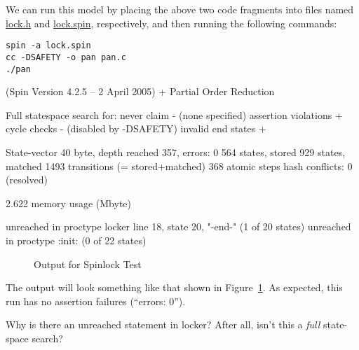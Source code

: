 We can run this model by placing the above two code fragments into
files named \url{lock.h} and \url{lock.spin}, respectively, and then running
the following commands:

\vspace{5pt}
\begin{minipage}[t]{\columnwidth}
\scriptsize
\begin{verbatim}
spin -a lock.spin
cc -DSAFETY -o pan pan.c
./pan
\end{verbatim}
\end{minipage}
\vspace{5pt}

{ \scriptsize
\begin{verbbox}
(Spin Version 4.2.5 -- 2 April 2005)
        + Partial Order Reduction

Full statespace search for:
        never claim             - (none specified)
        assertion violations    +
        cycle checks            - (disabled by -DSAFETY)
        invalid end states      +

State-vector 40 byte, depth reached 357, errors: 0
     564 states, stored
     929 states, matched
    1493 transitions (= stored+matched)
     368 atomic steps
hash conflicts: 0 (resolved)

2.622   memory usage (Mbyte)

unreached in proctype locker
        line 18, state 20, "-end-"
        (1 of 20 states)
unreached in proctype :init:
        (0 of 22 states)
\end{verbbox}
}
\begin{figure}[htbp]
\centering
\theverbbox
\caption{Output for Spinlock Test}
\label{fig:analysis:Output for Spinlock Test}
\end{figure}

The output will look something like that shown in
Figure~\ref{fig:analysis:Output for Spinlock Test}.
As expected, this run has no assertion failures (``errors: 0'').

\QuickQuiz{}
	Why is there an unreached statement in
	locker?  After all, isn't this a \emph{full} state-space
	search?
 \QuickQuizEnd

